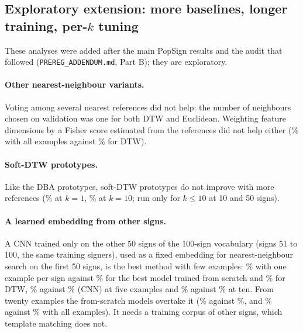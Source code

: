 \subsection{Exploratory extension: more baselines, longer training, per-$k$ tuning}
\label{sec:extension}
These analyses were added after the main PopSign results and the audit that followed (\texttt{PREREG\_ADDENDUM.md}, Part B); they are exploratory.
\begin{table}[t]
\centering\small
\resizebox{\columnwidth}{!}{}
\caption{PopSign, 50 signs: top-1 accuracy (\%) of additional methods and variants (exploratory) beside the main ones.}
\label{tab:ext}
\end{table}
\paragraph{Other nearest-neighbour variants.} Voting among several nearest references did not help: the number of neighbours chosen on validation was
one for both DTW and Euclidean. Weighting feature dimensions by a Fisher score estimated from the references did not help either
(\accWdtwVFiftyKAll\% with all examples against \accDtwVFiftyKAll\% for DTW).
\paragraph{Soft-DTW prototypes.} Like the DBA prototypes, soft-DTW prototypes do not improve with more references (\accSoftProtoVFiftyKOne\% at $k=1$, \accSoftProtoVFiftyKTen\% at $k=10$; run only for $k\le10$ at 10 and 50 signs).
\paragraph{A learned embedding from other signs.} A CNN trained only on the other 50 signs of the 100-sign vocabulary (signs 51 to 100, the same training signers), used as a fixed embedding for
nearest-neighbour search on the first 50 signs, is the best method with few examples: \accEmbedVFiftyKOne\% with one example per sign against \accTransVFiftyKOne\% for the best model trained from scratch and
\accDtwVFiftyKOne\% for DTW, \accEmbedVFiftyKFive\% against \accCnnVFiftyKFive\% (CNN) at five examples and \accEmbedVFiftyKTen\% against \accCnnVFiftyKTen\% at ten. From twenty examples the from-scratch models overtake it
(\accEmbedVFiftyKTwenty\% against \accCnnVFiftyKTwenty\%, and \accEmbedVFiftyKAll\% against \accTransVFiftyKAll\% with all examples). It needs a training corpus of other signs, which template matching does not.
